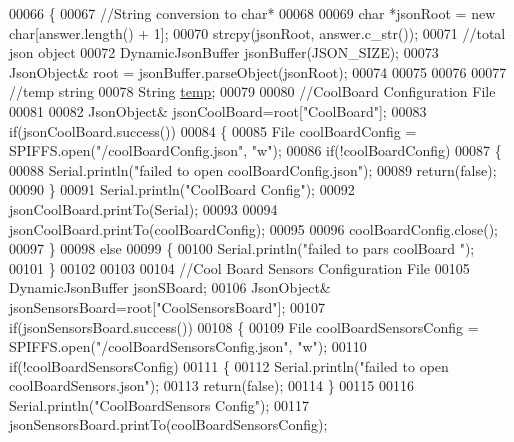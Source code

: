 \begin{DoxyCode}
00066 \{
00067     \textcolor{comment}{//String conversion to char*}
00068 
00069     \textcolor{keywordtype}{char} *jsonRoot = \textcolor{keyword}{new} \textcolor{keywordtype}{char}[answer.length() + 1];
00070     strcpy(jsonRoot, answer.c\_str());
00071     \textcolor{comment}{//total json object }
00072     DynamicJsonBuffer jsonBuffer(JSON\_SIZE);
00073     JsonObject& root = jsonBuffer.parseObject(jsonRoot);
00074 
00075 
00076         
00077     \textcolor{comment}{//temp string}
00078     String \hyperlink{_irene3000_8h_a5905d48604152cf57aa6bfa087b49173}{temp};
00079 
00080     \textcolor{comment}{//CoolBoard Configuration File}
00081 
00082         JsonObject& jsonCoolBoard=root[\textcolor{stringliteral}{"CoolBoard"}];
00083     \textcolor{keywordflow}{if}(jsonCoolBoard.success())
00084     \{
00085         File coolBoardConfig = SPIFFS.open(\textcolor{stringliteral}{"/coolBoardConfig.json"}, \textcolor{stringliteral}{"w"});   
00086         \textcolor{keywordflow}{if}(!coolBoardConfig)
00087         \{   
00088             Serial.println(\textcolor{stringliteral}{"failed to open coolBoardConfig.json"});
00089             \textcolor{keywordflow}{return}(\textcolor{keyword}{false});
00090         \}
00091         Serial.println(\textcolor{stringliteral}{"CoolBoard Config"});
00092         jsonCoolBoard.printTo(Serial);
00093         
00094         jsonCoolBoard.printTo(coolBoardConfig);
00095         
00096         coolBoardConfig.close();
00097     \}
00098     \textcolor{keywordflow}{else}
00099     \{
00100         Serial.println(\textcolor{stringliteral}{"failed to pars coolBoard "});
00101     \}       
00102 
00103     
00104     \textcolor{comment}{//Cool Board Sensors Configuration File}
00105     DynamicJsonBuffer jsonSBoard;
00106         JsonObject& jsonSensorsBoard=root[\textcolor{stringliteral}{"CoolSensorsBoard"}];  
00107     \textcolor{keywordflow}{if}(jsonSensorsBoard.success())
00108     \{   
00109         File coolBoardSensorsConfig = SPIFFS.open(\textcolor{stringliteral}{"/coolBoardSensorsConfig.json"}, \textcolor{stringliteral}{"w"}); 
00110         \textcolor{keywordflow}{if}(!coolBoardSensorsConfig)
00111         \{
00112             Serial.println(\textcolor{stringliteral}{"failed to open coolBoardSensors.json"});
00113             \textcolor{keywordflow}{return}(\textcolor{keyword}{false});
00114         \}
00115         
00116         Serial.println(\textcolor{stringliteral}{"CoolBoardSensors Config"});
00117         jsonSensorsBoard.printTo(coolBoardSensorsConfig);

\end{DoxyCode}
